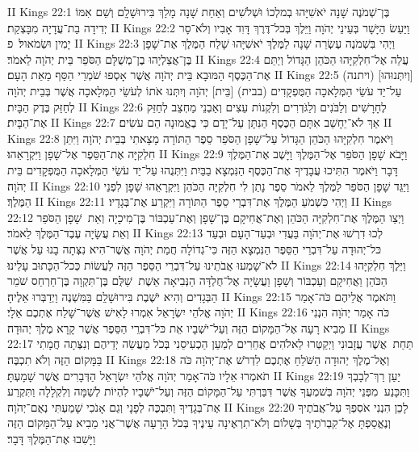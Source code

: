 II Kings 22:1	בֶּן־שְׁמֹנֶה שָׁנָה יֹאשִׁיָּהוּ בְמלְכוֹ וּשְׁלֹשִׁים וְאַחַת שָׁנָה מָלַךְ בִּירוּשָׁלָ͏ִם וְשֵׁם אִמּוֹ יְדִידָה בַת־עֲדָיָה מִבָּצְקַת׃
II Kings 22:2	וַיַּעַשׂ הַיָּשָׁר בְּעֵינֵי יְהֹוָה וַיֵּלֶךְ בְּכל־דֶּרֶךְ דָּוִד אָבִיו וְלֹא־סָר יָמִין וּשְׂמֹאול׃ {פ}
II Kings 22:3	וַיְהִי בִּשְׁמֹנֶה עֶשְׂרֵה שָׁנָה לַמֶּלֶךְ יֹאשִׁיָּהוּ שָׁלַח הַמֶּלֶךְ אֶת־שָׁפָן בֶּן־אֲצַלְיָהוּ בֶן־מְשֻׁלָּם הַסֹּפֵר בֵּית יְהֹוָה לֵאמֹר׃
II Kings 22:4	עֲלֵה אֶל־חִלְקִיָּהוּ הַכֹּהֵן הַגָּדוֹל וְיַתֵּם אֶת־הַכֶּסֶף הַמּוּבָא בֵּית יְהֹוָה אֲשֶׁר אָסְפוּ שֹׁמְרֵי הַסַּף מֵאֵת הָעָם׃
II Kings 22:5	(ויתנה) [וְיִתְּנוּהוּ] עַל־יַד עֹשֵׂי הַמְּלָאכָה הַמֻּפְקָדִים (בבית) [בֵּית] יְהֹוָה וְיִתְּנוּ אֹתוֹ לְעֹשֵׂי הַמְּלָאכָה אֲשֶׁר בְּבֵית יְהֹוָה לְחַזֵּק בֶּדֶק הַבָּיִת׃
II Kings 22:6	לֶחָרָשִׁים וְלַבֹּנִים וְלַגֹּדְרִים וְלִקְנוֹת עֵצִים וְאַבְנֵי מַחְצֵב לְחַזֵּק אֶת־הַבָּיִת׃
II Kings 22:7	אַךְ לֹא־יֵחָשֵׁב אִתָּם הַכֶּסֶף הַנִּתָּן עַל־יָדָם כִּי בֶאֱמוּנָה הֵם עֹשִׂים׃
II Kings 22:8	וַיֹּאמֶר חִלְקִיָּהוּ הַכֹּהֵן הַגָּדוֹל עַל־שָׁפָן הַסֹּפֵר סֵפֶר הַתּוֹרָה מָצָאתִי בְּבֵית יְהֹוָה וַיִּתֵּן חִלְקִיָּה אֶת־הַסֵּפֶר אֶל־שָׁפָן וַיִּקְרָאֵהוּ׃
II Kings 22:9	וַיָּבֹא שָׁפָן הַסֹּפֵר אֶל־הַמֶּלֶךְ וַיָּשֶׁב אֶת־הַמֶּלֶךְ דָּבָר וַיֹּאמֶר הִתִּיכוּ עֲבָדֶיךָ אֶת־הַכֶּסֶף הַנִּמְצָא בַבַּיִת וַיִּתְּנֻהוּ עַל־יַד עֹשֵׂי הַמְּלָאכָה הַמֻּפְקָדִים בֵּית יְהֹוָה׃
II Kings 22:10	וַיַּגֵּד שָׁפָן הַסֹּפֵר לַמֶּלֶךְ לֵאמֹר סֵפֶר נָתַן לִי חִלְקִיָּה הַכֹּהֵן וַיִּקְרָאֵהוּ שָׁפָן לִפְנֵי הַמֶּלֶךְ׃
II Kings 22:11	וַיְהִי כִּשְׁמֹעַ הַמֶּלֶךְ אֶת־דִּבְרֵי סֵפֶר הַתּוֹרָה וַיִּקְרַע אֶת־בְּגָדָיו׃
II Kings 22:12	וַיְצַו הַמֶּלֶךְ אֶת־חִלְקִיָּה הַכֹּהֵן וְאֶת־אֲחִיקָם בֶּן־שָׁפָן וְאֶת־עַכְבּוֹר בֶּן־מִיכָיָה וְאֵת  שָׁפָן הַסֹּפֵר וְאֵת עֲשָׂיָה עֶבֶד־הַמֶּלֶךְ לֵאמֹר׃
II Kings 22:13	לְכוּ דִרְשׁוּ אֶת־יְהֹוָה בַּעֲדִי וּבְעַד־הָעָם וּבְעַד כּל־יְהוּדָה עַל־דִּבְרֵי הַסֵּפֶר הַנִּמְצָא הַזֶּה כִּי־גְדוֹלָה חֲמַת יְהֹוָה אֲשֶׁר־הִיא נִצְּתָה בָנוּ עַל אֲשֶׁר לֹא־שָׁמְעוּ אֲבֹתֵינוּ עַל־דִּבְרֵי הַסֵּפֶר הַזֶּה לַעֲשׂוֹת כְּכל־הַכָּתוּב עָלֵינוּ׃
II Kings 22:14	וַיֵּלֶךְ חִלְקִיָּהוּ הַכֹּהֵן וַאֲחִיקָם וְעַכְבּוֹר וְשָׁפָן וַעֲשָׂיָה אֶל־חֻלְדָּה הַנְּבִיאָה אֵשֶׁת  שַׁלֻּם בֶּן־תִּקְוָה בֶּן־חַרְחַס שֹׁמֵר הַבְּגָדִים וְהִיא יֹשֶׁבֶת בִּירוּשָׁלַ͏ִם בַּמִּשְׁנֶה וַיְדַבְּרוּ אֵלֶיהָ׃
II Kings 22:15	וַתֹּאמֶר אֲלֵיהֶם כֹּה־אָמַר יְהֹוָה אֱלֹהֵי יִשְׂרָאֵל אִמְרוּ לָאִישׁ אֲשֶׁר־שָׁלַח אֶתְכֶם אֵלָי׃
II Kings 22:16	כֹּה אָמַר יְהֹוָה הִנְנִי מֵבִיא רָעָה אֶל־הַמָּקוֹם הַזֶּה וְעַל־יֹשְׁבָיו אֵת כּל־דִּבְרֵי הַסֵּפֶר אֲשֶׁר קָרָא מֶלֶךְ יְהוּדָה׃
II Kings 22:17	תַּחַת  אֲשֶׁר עֲזָבוּנִי וַיְקַטְּרוּ לֵאלֹהִים אֲחֵרִים לְמַעַן הַכְעִיסֵנִי בְּכֹל מַעֲשֵׂה יְדֵיהֶם וְנִצְּתָה חֲמָתִי בַּמָּקוֹם הַזֶּה וְלֹא תִכְבֶּה׃
II Kings 22:18	וְאֶל־מֶלֶךְ יְהוּדָה הַשֹּׁלֵחַ אֶתְכֶם לִדְרֹשׁ אֶת־יְהֹוָה כֹּה תֹאמְרוּ אֵלָיו כֹּה־אָמַר יְהֹוָה אֱלֹהֵי יִשְׂרָאֵל הַדְּבָרִים אֲשֶׁר שָׁמָעְתָּ׃
II Kings 22:19	יַעַן רַךְ־לְבָבְךָ וַתִּכָּנַע  מִפְּנֵי יְהֹוָה בְּשׁמְעֲךָ אֲשֶׁר דִּבַּרְתִּי עַל־הַמָּקוֹם הַזֶּה וְעַל־יֹשְׁבָיו לִהְיוֹת לְשַׁמָּה וְלִקְלָלָה וַתִּקְרַע אֶת־בְּגָדֶיךָ וַתִּבְכֶּה לְפָנָי וְגַם אָנֹכִי שָׁמַעְתִּי נְאֻם־יְהֹוָה׃
II Kings 22:20	לָכֵן הִנְנִי אֹסִפְךָ עַל־אֲבֹתֶיךָ וְנֶאֱסַפְתָּ אֶל־קִבְרֹתֶיךָ בְּשָׁלוֹם וְלֹא־תִרְאֶינָה עֵינֶיךָ בְּכֹל הָרָעָה אֲשֶׁר־אֲנִי מֵבִיא עַל־הַמָּקוֹם הַזֶּה וַיָּשִׁבוּ אֶת־הַמֶּלֶךְ דָּבָר׃
